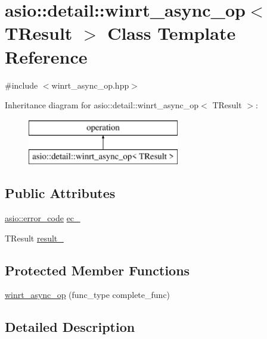 \hypertarget{classasio_1_1detail_1_1winrt__async__op}{}\section{asio\+:\+:detail\+:\+:winrt\+\_\+async\+\_\+op$<$ T\+Result $>$ Class Template Reference}
\label{classasio_1_1detail_1_1winrt__async__op}


{\ttfamily \#include $<$winrt\+\_\+async\+\_\+op.\+hpp$>$}

Inheritance diagram for asio\+:\+:detail\+:\+:winrt\+\_\+async\+\_\+op$<$ T\+Result $>$\+:\begin{figure}[H]
\begin{center}
\leavevmode
\includegraphics[height=2.000000cm]{classasio_1_1detail_1_1winrt__async__op}
\end{center}
\end{figure}
\subsection*{Public Attributes}
\begin{DoxyCompactItemize}
\item 
\hyperlink{classasio_1_1error__code}{asio\+::error\+\_\+code} \hyperlink{classasio_1_1detail_1_1winrt__async__op_a4b60f8bff9a9aa62182aca303d4e7ecd}{ec\+\_\+}
\item 
T\+Result \hyperlink{classasio_1_1detail_1_1winrt__async__op_a7a3a44d2ff57632838036a8c279a7a65}{result\+\_\+}
\end{DoxyCompactItemize}
\subsection*{Protected Member Functions}
\begin{DoxyCompactItemize}
\item 
\hyperlink{classasio_1_1detail_1_1winrt__async__op_a9892a30f4c7de5b5bf8a13c15d5aefda}{winrt\+\_\+async\+\_\+op} (func\+\_\+type complete\+\_\+func)
\end{DoxyCompactItemize}


\subsection{Detailed Description}

